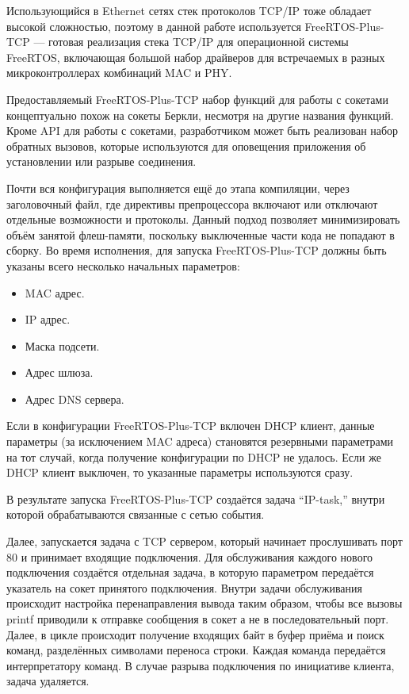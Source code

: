 \documentclass[rusmathsym, eqnumwithinsec, amspack, hyperref]{bomgost}
\begin{document}
Использующийся в Ethernet сетях стек протоколов TCP/IP тоже обладает высокой сложностью, поэтому в данной работе используется FreeRTOS-Plus-TCP --- готовая реализация стека TCP/IP для операционной системы FreeRTOS, включающая  большой набор драйверов для встречаемых в разных микроконтроллерах комбинаций MAC и PHY.

Предоставляемый FreeRTOS-Plus-TCP набор функций для работы с сокетами концептуально похож на сокеты Беркли, несмотря на другие названия функций. Кроме API для работы с сокетами, разработчиком может быть реализован набор обратных вызовов, которые используются для оповещения приложения об установлении или разрыве соединения.

Почти вся конфигурация выполняется ещё до этапа компиляции, через заголовочный файл, где директивы препроцессора включают или отключают отдельные возможности и протоколы. Данный подход позволяет минимизировать объём занятой флеш-памяти, поскольку выключенные части кода не попадают в сборку. Во время исполнения, для запуска FreeRTOS-Plus-TCP должны быть указаны всего несколько начальных параметров:

\begin{itemize}
	\item MAC адрес.
	\item IP адрес.
	\item Маска подсети.
	\item Адрес шлюза.
	\item Адрес DNS сервера.
\end{itemize}

Если в конфигурации FreeRTOS-Plus-TCP включен DHCP клиент, данные параметры (за исключением MAC адреса) становятся резервными параметрами на тот случай, когда получение конфигурации по DHCP не удалось. Если же DHCP клиент выключен, то указанные параметры используются сразу.

В результате запуска FreeRTOS-Plus-TCP создаётся задача ``IP-task,'' внутри которой обрабатываются связанные с сетью события.

Далее, запускается задача с TCP сервером, который начинает прослушивать порт 80 и принимает входящие подключения. Для обслуживания каждого нового подключения создаётся отдельная задача, в которую параметром передаётся указатель на сокет принятого подключения. Внутри задачи обслуживания происходит настройка перенаправления вывода таким образом, чтобы все вызовы printf приводили к отправке сообщения в сокет а не в последовательный порт. Далее, в цикле происходит получение входящих байт в буфер приёма и поиск команд, разделённых символами переноса строки. Каждая команда передаётся интерпретатору команд. В случае разрыва подключения по инициативе клиента, задача удаляется.
\end{document}
